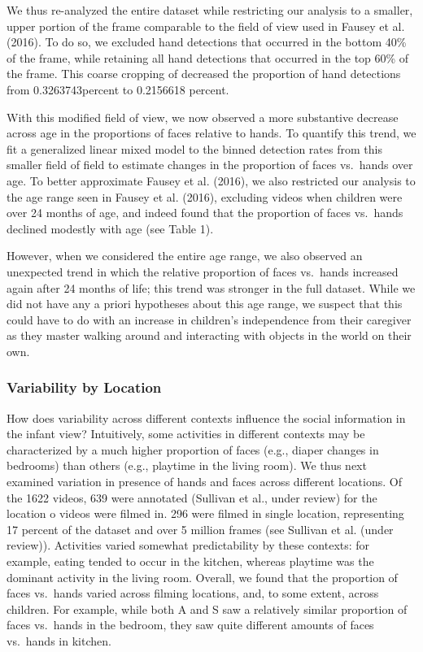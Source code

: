 \documentclass[10pt, letterpaper]{article}
\begin{document}
We thus re-analyzed the entire dataset while restricting our analysis to
a smaller, upper portion of the frame comparable to the field of view
used in Fausey et al. (2016). To do so, we excluded hand detections that
occurred in the bottom 40\% of the frame, while retaining all hand
detections that occurred in the top 60\% of the frame. This coarse
cropping of decreased the proportion of hand detections from
0.3263743percent to 0.2156618 percent.

With this modified field of view, we now observed a more substantive
decrease across age in the proportions of faces relative to hands. To
quantify this trend, we fit a generalized linear mixed model to the
binned detection rates from this smaller field of field to estimate
changes in the proportion of faces vs.~hands over age. To better
approximate Fausey et al. (2016), we also restricted our analysis to the
age range seen in Fausey et al. (2016), excluding videos when children
were over 24 months of age, and indeed found that the proportion of
faces vs.~hands declined modestly with age (see Table 1).

However, when we considered the entire age range, we also observed an
unexpected trend in which the relative proportion of faces vs.~hands
increased again after 24 months of life; this trend was stronger in the
full dataset. While we did not have any a priori hypotheses about this
age range, we suspect that this could have to do with an increase in
children's independence from their caregiver as they master walking
around and interacting with objects in the world on their own.

\subsubsection{Variability by Location}\label{variability-by-location}

How does variability across different contexts influence the social
information in the infant view? Intuitively, some activities in
different contexts may be characterized by a much higher proportion of
faces (e.g., diaper changes in bedrooms) than others (e.g., playtime in
the living room). We thus next examined variation in presence of hands
and faces across different locations. Of the 1622 videos, 639 were
annotated (Sullivan et al., under review) for the location o videos were
filmed in. 296 were filmed in single location, representing 17 percent
of the dataset and over 5 million frames (see Sullivan et al. (under
review)). Activities varied somewhat predictability by these contexts:
for example, eating tended to occur in the kitchen, whereas playtime was
the dominant activity in the living room. Overall, we found that the
proportion of faces vs.~hands varied across filming locations, and, to
some extent, across children. For example, while both A and S saw a
relatively similar proportion of faces vs.~hands in the bedroom, they
saw quite different amounts of faces vs.~hands in kitchen.
\end{document}
